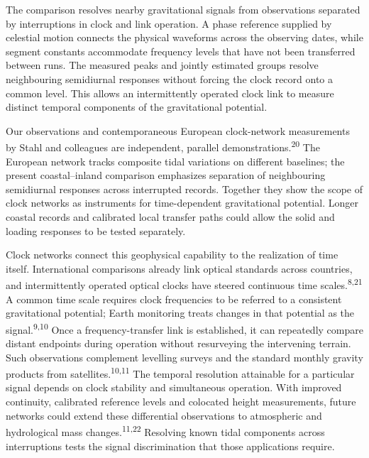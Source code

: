 \documentclass[
  10pt,
  a4paper,
]{article}
\begin{document}
The comparison resolves nearby gravitational signals from observations
separated by interruptions in clock and link operation. A phase
reference supplied by celestial motion connects the physical waveforms
across the observing dates, while segment constants accommodate
frequency levels that have not been transferred between runs. The
measured peaks and jointly estimated groups resolve neighbouring
semidiurnal responses without forcing the clock record onto a common
level. This allows an intermittently operated clock link to measure
distinct temporal components of the gravitational potential.

Our observations and contemporaneous European clock-network measurements
by Stahl and colleagues are independent, parallel
demonstrations.\textsuperscript{20} The European network tracks
composite tidal variations on different baselines; the present
coastal--inland comparison emphasizes separation of neighbouring
semidiurnal responses across interrupted records. Together they show the
scope of clock networks as instruments for time-dependent gravitational
potential. Longer coastal records and calibrated local transfer paths
could allow the solid and loading responses to be tested separately.

Clock networks connect this geophysical capability to the realization of
time itself. International comparisons already link optical standards
across countries, and intermittently operated optical clocks have
steered continuous time scales.\textsuperscript{8,21} A common time
scale requires clock frequencies to be referred to a consistent
gravitational potential; Earth monitoring treats changes in that
potential as the signal.\textsuperscript{9,10} Once a frequency-transfer
link is established, it can repeatedly compare distant endpoints during
operation without resurveying the intervening terrain. Such observations
complement levelling surveys and the standard monthly gravity products
from satellites.\textsuperscript{10,11} The temporal resolution
attainable for a particular signal depends on clock stability and
simultaneous operation. With improved continuity, calibrated reference
levels and colocated height measurements, future networks could extend
these differential observations to atmospheric and hydrological mass
changes.\textsuperscript{11,22} Resolving known tidal components across
interruptions tests the signal discrimination that those applications
require.

\clearpage

\singlespacing
\end{document}
